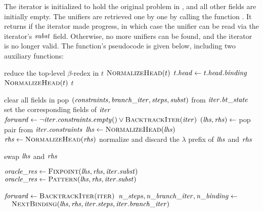 The iterator is initialized to hold the original problem in ,
and all other fields are initially empty. The unifiers are retrieved one by one by
calling the function . It returns  if the iterator made
progress, in which case the unifier can be read via the iterator's
$\mathit{subst}$ field. Otherwise, no more unifiers can be found, and the iterator is
no longer valid. The function's pseudocode is given below, including two
auxiliary functions:
  
\begin{algorithmic}[]
      \State reduce the top-level $\beta$-redex in $t$
      \State \Return $\textsc{NormalizeHead}(t)$
      \State $\mathit{t.head} \gets \mathit{t.head.binding}$
      \State \Return $\textsc{NormalizeHead}(t)$
    \Else{}
      \State \Return $t$
    \EndIf
  \EndFunction
  
  \vspace{\jot}
      \State clear all fields in 
      \State \Return {}
    \Else
    \State pop $(\mathit{constraints}, \mathit{branch\_iter}, \mathit{steps}, \mathit{subst})$ from $\mathit{iter.bt\_state}$
    \State set the corresponding fields of $\mathit{iter}$
    \State \Return {}
    \EndIf
  \EndFunction
  \vspace{\jot}
  \State $\mathit{forward} \gets \neg \mathit{iter.constraints.empty()} \lor \textsc{BacktrackIter}(\mathit{iter})$
    \State $(\mathit{lhs}, \mathit{rhs}) \gets $ pop pair from $\mathit{iter.constraints}$
    \State $\mathit{lhs} \gets \textsc{NormalizeHead}(\mathit{lhs})$
    \State $\mathit{rhs} \gets \textsc{NormalizeHead}(\mathit{rhs})$
    \State normalize and discard the $\lambda$ prefix of $\mathit{lhs}$ and $\mathit{rhs}$

      \State swap $\mathit{lhs}$ and $\mathit{rhs}$
    \EndIf

      \State $\mathit{oracle\_res} \gets \textsc{Fixpoint}(\mathit{lhs, rhs, iter.subst}) $
        \State $\mathit{oracle\_res} \gets \textsc{Pattern}(\mathit{lhs, rhs, iter.subst}) $
      \EndIf

        \State $\mathit{forward} \gets \textsc{BacktrackIter(iter)}$
        \State $\mathit{n\_steps}, \mathit{n\_branch\_iter}, \mathit{n\_binding} \gets$
        \State $\quad \textsc{NextBinding}(\mathit{lhs}, \mathit{rhs}, \mathit{iter.steps}, \mathit{iter.branch\_iter})$
        

\end{algorithmic}
